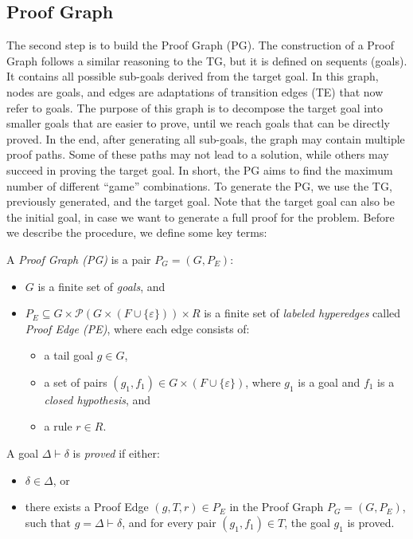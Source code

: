 \subsection{Proof Graph}
The second step is to build the Proof Graph (PG). The construction of a Proof Graph follows a similar reasoning to the TG, but it is defined on sequents (goals). It contains all possible sub-goals derived from the target goal. In this graph, nodes are goals, and edges are adaptations of transition edges (TE) that now refer to goals. 
%
The purpose of this graph is to decompose the target goal into smaller goals that are easier to prove, until we reach goals that can be directly proved. In the end, after generating all sub-goals, the graph may contain multiple proof paths. 
%
Some of these paths may not lead to a solution, while others may succeed in proving the target goal. In short, the PG aims to find the maximum number of different ``game'' combinations. To generate the PG, we use the TG, previously generated, and the target goal. Note that the target goal can also be the initial goal, in case we want to generate a full proof for the problem. Before we describe the procedure, we define some key terms:

\begin{definition}
A \emph{Proof Graph (PG)} is a pair $P_G = (G, P_E)$:
\begin{itemize}
  \item \( G \) is a finite set of \emph{goals}, and
  \item \( P_E \subseteq G \times \mathcal{P}(G \times (F \cup \{\varepsilon\})) \times R \) is a finite set of \emph{labeled hyperedges} called \emph{Proof Edge (PE)}, where each edge consists of:
  \begin{itemize}
    \item a tail goal \( g \in G \),
    \item a set of pairs \( (g_1, f_1) \in G \times (F \cup \{\varepsilon\}) \), where \( g_1 \) is a goal and \( f_1 \) is a \emph{closed hypothesis}, and
    \item a rule \( r \in R \).
  \end{itemize}
\end{itemize}
\end{definition}

\begin{definition}
A goal \( \Delta \vdash \delta \) is \emph{proved} if either:
\begin{itemize}
  \item \( \delta \in \Delta \), or
  \item there exists a Proof Edge \( (g, T, r) \in P_E \) in the Proof Graph \( P_G = (G, P_E) \), such that \( g = \Delta \vdash \delta \), and for every pair \( (g_1, f_1) \in T \), the goal \( g_1 \) is proved.
\end{itemize}
\end{definition}

